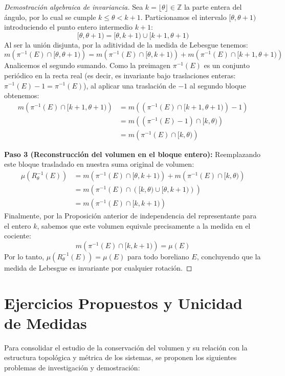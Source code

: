 \begin{proof}[Demostración algebraica de invariancia]
	Sea $k = \lfloor \theta \rfloor \in \mathbb{Z}$ la parte entera del ángulo, por lo cual se cumple $k \le \theta < k+1$. Particionamos el intervalo $[\theta, \theta+1)$ introduciendo el punto entero intermedio $k+1$:
	$$ [\theta, \theta+1) = [\theta, k+1) \cup [k+1, \theta+1) $$
	Al ser la unión disjunta, por la aditividad de la medida de Lebesgue tenemos:
	$$ m\left( \pi^{-1}(E) \cap [\theta, \theta + 1) \right) = m\left( \pi^{-1}(E) \cap [\theta, k+1) \right) + m\left( \pi^{-1}(E) \cap [k+1, \theta+1) \right) $$
	Analicemos el segundo sumando. Como la preimagen $\pi^{-1}(E)$ es un conjunto periódico en la recta real (es decir, es invariante bajo traslaciones enteras: $\pi^{-1}(E) - 1 = \pi^{-1}(E)$), al aplicar una traslación de $-1$ al segundo bloque obtenemos:
	\begin{align*}
		m\left( \pi^{-1}(E) \cap [k+1, \theta+1) \right) &= m\left( \left( \pi^{-1}(E) \cap [k+1, \theta+1) \right) - 1 \right) \\
		&= m\left( (\pi^{-1}(E) - 1) \cap [k, \theta) \right) \\
		&= m\left( \pi^{-1}(E) \cap [k, \theta) \right)
	\end{align*}
	
	\textbf{Paso 3 (Reconstrucción del volumen en el bloque entero):} Reemplazando este bloque trasladado en nuestra suma original de volumen:
	\begin{align*}
		\mu(R_\theta^{-1}(E)) &= m\left( \pi^{-1}(E) \cap [\theta, k+1) \right) + m\left( \pi^{-1}(E) \cap [k, \theta) \right) \\
		&= m\left( \pi^{-1}(E) \cap \left( [k, \theta) \cup [\theta, k+1) \right) \right) \\
		&= m\left( \pi^{-1}(E) \cap [k, k+1) \right)
	\end{align*}
	Finalmente, por la Proposición anterior de independencia del representante para el entero $k$, sabemos que este volumen equivale precisamente a la medida en el cociente:
	$$ m\left( \pi^{-1}(E) \cap [k, k+1) \right) = \mu(E) $$
	Por lo tanto, $\mu(R_\theta^{-1}(E)) = \mu(E)$ para todo boreliano $E$, concluyendo que la medida de Lebesgue es invariante por cualquier rotación.
\end{proof}


\section{Ejercicios Propuestos y Unicidad de Medidas}

Para consolidar el estudio de la conservación del volumen y su relación con la estructura topológica y métrica de los sistemas, se proponen los siguientes problemas de investigación y demostración:

